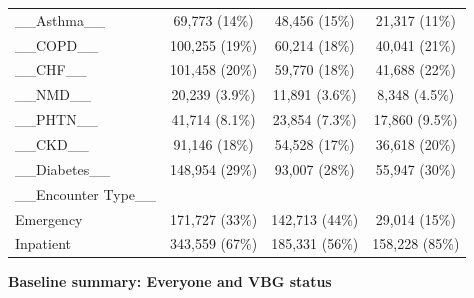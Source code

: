 \documentclass[
  11pt,
  letterpaper,
  DIV=11,
  numbers=noendperiod]{scrartcl}
\begin{document}
\begin{longtable*}{>{\raggedright\arraybackslash}p{2.0in}ccc}
\_\_Asthma\_\_ & 69,773 (14\%) & 48,456 (15\%) & 21,317 (11\%)\\
\addlinespace
\_\_COPD\_\_ & 100,255 (19\%) & 60,214 (18\%) & 40,041 (21\%)\\
\_\_CHF\_\_ & 101,458 (20\%) & 59,770 (18\%) & 41,688 (22\%)\\
\_\_NMD\_\_ & 20,239 (3.9\%) & 11,891 (3.6\%) & 8,348 (4.5\%)\\
\_\_PHTN\_\_ & 41,714 (8.1\%) & 23,854 (7.3\%) & 17,860 (9.5\%)\\
\_\_CKD\_\_ & 91,146 (18\%) & 54,528 (17\%) & 36,618 (20\%)\\
\addlinespace
\_\_Diabetes\_\_ & 148,954 (29\%) & 93,007 (28\%) & 55,947 (30\%)\\
\_\_Encounter Type\_\_ &  &  & \\
Emergency & 171,727 (33\%) & 142,713 (44\%) & 29,014 (15\%)\\
Inpatient & 343,559 (67\%) & 185,331 (56\%) & 158,228 (85\%)\\*
\end{longtable*}

\endgroup{}

\begin{center}\textbf{Baseline summary: Everyone and VBG status}\end{center}

\begingroup\fontsize{7}{9}\selectfont
\end{document}
